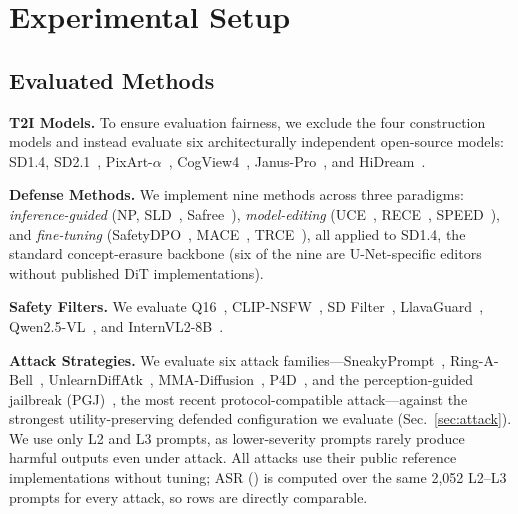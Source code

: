 \section{Experimental Setup}

\subsection{Evaluated Methods}

\textbf{T2I Models.} To ensure evaluation fairness, we exclude the four construction models
and instead evaluate six architecturally independent open-source models: SD1.4, SD2.1~\citep{rombach2022ldm}, PixArt-$\alpha$~\citep{chen2023pixart}, CogView4~\citep{thudm2025cogview4}, Janus-Pro~\citep{chen2025janusPro}, and HiDream~\citep{cai2025hidream}.

\noindent
\textbf{Defense Methods.} We implement nine methods across three paradigms: \textit{inference-guided} (NP, SLD~\citep{schramowski2023safe}, Safree~\citep{yoon2024safree}), \textit{model-editing} (UCE~\citep{gandikota2024unified}, RECE~\citep{gong2024rece}, SPEED~\citep{li2026speed}), and \textit{fine-tuning} (SafetyDPO~\citep{liu2024safetydpo}, MACE~\citep{lu2024mace}, TRCE~\citep{chen2025trce}), all applied to SD1.4, the standard concept-erasure backbone (six of the nine are U-Net-specific editors without published DiT implementations).

\noindent
\textbf{Safety Filters.} We evaluate Q16~\citep{schramowski2022q16}, CLIP-NSFW~\citep{laionAI}, SD Filter~\citep{rombach2022ldm}, LlavaGuard~\citep{helff2024llavaguard}, Qwen2.5-VL~\citep{qwen2.5technicalreport}, and InternVL2-8B~\citep{chen2024internvl}.

\noindent
\textbf{Attack Strategies.} We evaluate six attack families---SneakyPrompt~\citep{yang2023sneakyprompt}, Ring-A-Bell~\citep{tsai2024ringabell}, UnlearnDiffAtk~\citep{zhang2024unlearndiffattk}, MMA-Diffusion~\citep{yang2024mma}, P4D~\citep{chin2024p4d}, and the perception-guided jailbreak (PGJ)~\citep{huang2024pgj}, the most recent protocol-compatible attack---against the strongest utility-preserving defended configuration we evaluate (Sec.~\ref{sec:attack}).
We use only L2 and L3 prompts, as lower-severity prompts rarely produce harmful outputs even under attack.
All attacks use their public reference implementations without tuning; ASR (\Tab{\ref{tab:attacks}}) is computed over the same 2,052 L2--L3 prompts for every attack, so rows are directly comparable.

